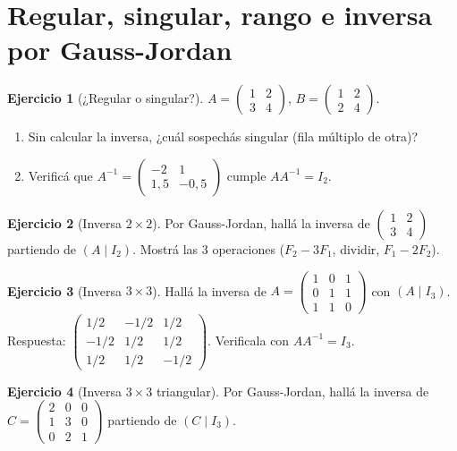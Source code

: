 \documentclass[a4paper,12pt]{article}
\theoremstyle{definition}
\newtheorem{ejercicio}{Ejercicio}[section]
\begin{document}
\section{Regular, singular, rango e inversa por Gauss-Jordan}
\begin{ejercicio}[¿Regular o singular?]
$A=\begin{pmatrix} 1 & 2 \\ 3 & 4 \end{pmatrix}$, $B=\begin{pmatrix} 1 & 2 \\ 2 & 4 \end{pmatrix}$.
\begin{enumerate}[label=\alph*)]
\item Sin calcular la inversa, ¿cuál sospechás singular (fila múltiplo de otra)?
\item Verificá que $A^{-1}=\begin{pmatrix} -2 & 1 \\ 1{,}5 & -0{,}5 \end{pmatrix}$ cumple $AA^{-1}=I_2$.
\end{enumerate}
\end{ejercicio}

\begin{ejercicio}[Inversa $2 \times 2$]
Por Gauss-Jordan, hallá la inversa de $\begin{pmatrix} 1 & 2 \\ 3 & 4 \end{pmatrix}$ partiendo de $(A\mid I_2)$. Mostrá las 3 operaciones ($F_2-3F_1$, dividir, $F_1-2F_2$).
\end{ejercicio}

\begin{ejercicio}[Inversa $3 \times 3$]
Hallá la inversa de $A=\begin{pmatrix} 1 & 0 & 1 \\ 0 & 1 & 1 \\ 1 & 1 & 0 \end{pmatrix}$ con $(A\mid I_3)$. Respuesta: $\begin{pmatrix} 1/2 & -1/2 & 1/2 \\ -1/2 & 1/2 & 1/2 \\ 1/2 & 1/2 & -1/2 \end{pmatrix}$. Verificala con $AA^{-1}=I_3$.
\end{ejercicio}

\begin{ejercicio}[Inversa $3 \times 3$ triangular]
Por Gauss-Jordan, hallá la inversa de $C=\begin{pmatrix} 2 & 0 & 0 \\ 1 & 3 & 0 \\ 0 & 2 & 1 \end{pmatrix}$ partiendo de $(C\mid I_3)$.
\end{ejercicio}
\end{document}
